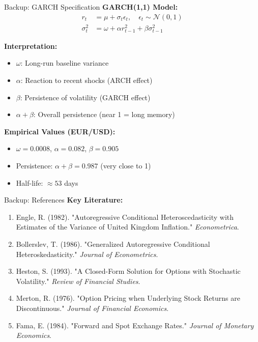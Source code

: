 \documentclass[11pt,aspectratio=169]{beamer}
\begin{document}
	\begin{frame}{Backup: GARCH Specification}
		\textbf{GARCH(1,1) Model:}
		\begin{align*}
			r_t &= \mu + \sigma_t \epsilon_t, \quad \epsilon_t \sim \mathcal{N}(0,1) \\
			\sigma_t^2 &= \omega + \alpha r_{t-1}^2 + \beta \sigma_{t-1}^2
		\end{align*}
		
		\vspace{0.3cm}
		
		\textbf{Interpretation:}
		\begin{itemize}
			\item $\omega$: Long-run baseline variance
			\item $\alpha$: Reaction to recent shocks (ARCH effect)
			\item $\beta$: Persistence of volatility (GARCH effect)
			\item $\alpha + \beta$: Overall persistence (near 1 = long memory)
		\end{itemize}
		
		\vspace{0.3cm}
		
		\textbf{Empirical Values (EUR/USD):}
		\begin{itemize}
			\item $\omega = 0.0008$, $\alpha = 0.082$, $\beta = 0.905$
			\item Persistence: $\alpha + \beta = 0.987$ (very close to 1)
			\item Half-life: $\approx 53$ days
		\end{itemize}
	\end{frame}
	
	\begin{frame}{Backup: References}
		\small
		\textbf{Key Literature:}
		\begin{enumerate}
			\item Engle, R. (1982). "Autoregressive Conditional Heteroscedasticity with Estimates of the Variance of United Kingdom Inflation." \textit{Econometrica}.
			
			\item Bollerslev, T. (1986). "Generalized Autoregressive Conditional Heteroskedasticity." \textit{Journal of Econometrics}.
			
			\item Heston, S. (1993). "A Closed-Form Solution for Options with Stochastic Volatility." \textit{Review of Financial Studies}.
			
			\item Merton, R. (1976). "Option Pricing when Underlying Stock Returns are Discontinuous." \textit{Journal of Financial Economics}.
			
			\item Fama, E. (1984). "Forward and Spot Exchange Rates." \textit{Journal of Monetary Economics}.
		\end{enumerate}
	\end{frame}
	
	
	
	




	
	
	
\end{document}

